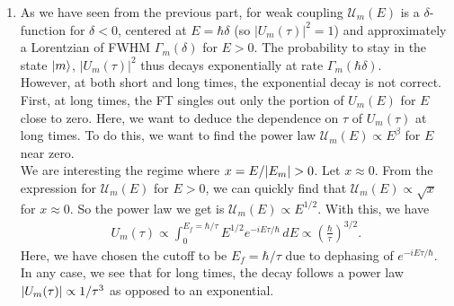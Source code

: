 \documentclass{article}
\theoremstyle{definition}
\newcommand{\be}{\beta}
\newcommand{\f}[2]{\frac{#1}{#2}}
\newcommand{\lp}{\left(}
\newcommand{\rp}{\right)}
\begin{document}
\begin{enumerate}[label=(\alph*)]
\item As we have seen from the previous part, for weak coupling $\mathcal{U}_m(E)$ is a $\delta$-function for $\delta < 0$, centered at $E = \hbar \delta$ (so $|U_m(\tau)|^2 = 1$) and approximately a Lorentzian of FWHM $\Gamma_m(\delta)$ for $E > 0$. The probability to stay in the state $\ket{m}$, $|U_m(\tau)|^2$ thus decays exponentially at rate $\Gamma_m(\hbar \delta)$. \\

However, at both short and long times, the exponential decay is not correct. First, at long times, the FT singles out only the portion of $U_m(E)$ for $E$ close to zero. Here, we want to deduce the dependence on $\tau$ of $U_m(\tau)$ at long times. To do this, we want to find the power law $\mathcal{U}_m(E) \propto E^\be$ for $E$ near zero. \\

We are interesting the regime where $x = E / \abs{E_m} >0$. Let $x\approx 0$. From the expression for $\mathcal{U}_m(E)$ for $E>0$, we can quickly find that $\mathcal{U}_m(E) \propto \sqrt{x}$ for $x\approx 0$. So the power law we get is $\mathcal{U}_m(E) \propto E^{1/2}$. With this, we have
\begin{align*}
U_m(\tau) \propto \int_0^{E_f = \hbar/\tau} E^{1/2} e^{-i E \tau / \hbar }\,dE \propto \lp \f{\hbar}{\tau} \rp^{3/2}.  
\end{align*}
Here, we have chosen the cutoff to be $E_f = \hbar / \tau$  due to dephasing of $e^{-i E \tau/\hbar}$. \\

In any case, we see that for long times, the decay follows a power law $\abs{U_m(\tau)}\propto 1/\tau^{3}$ as opposed to an exponential.




\end{enumerate}
\end{document}

